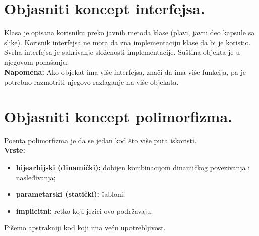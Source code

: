 \documentclass[a4paper]{article}
\begin{document}
\section{Objasniti koncept interfejsa.}
  Klasa je opisana korisniku preko javnih metoda klase (plavi, javni deo kapsule sa slike). Korisnik 
  interfejsa ne mora da zna implementaciju klase da bi je koristio. \\
  \indent Svrha interfejsa je sakrivanje složenosti implementacije. Suština objekta je 
  u njegovom ponašanju.\\
  \textbf{Napomena:} Ako objekat ima više interfejsa, znači da ima više funkcija, pa je potrebno
  razmotriti njegovo razlaganje na više objekata.

\section{Objasniti koncept polimorfizma.}
  \noindent Poenta polimorfizma je da se jedan kod što više puta iskoristi. \\
  \textbf{Vrste:}
  \begin{itemize}
    \item \textbf{hijearhijski (dinamički):} dobijen kombinacijom dinamičkog povezivanja i nasleđivanja;
    \item \textbf{parametarski (statički):} šabloni;
    \item \textbf{implicitni:} retko koji jezici ovo podržavaju.
  \end{itemize}
  Pišemo apstrakniji kod koji ima veću upotrebljivost. \cite{catonmat_polymorphism}
\end{document}
